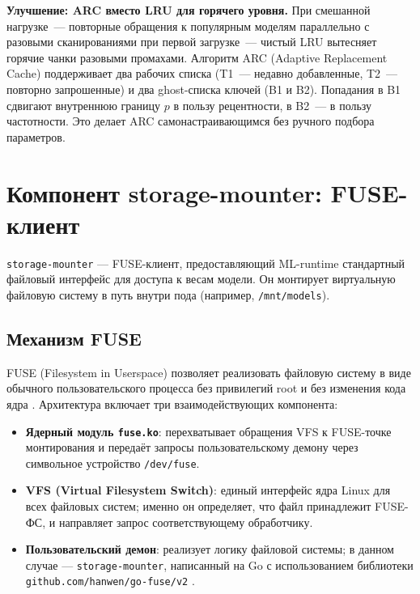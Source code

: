 \textbf{Улучшение: ARC вместо LRU для горячего уровня.} При смешанной нагрузке~--- повторные обращения к популярным моделям параллельно с разовыми сканированиями при первой загрузке~--- чистый LRU вытесняет горячие чанки разовыми промахами. Алгоритм ARC (Adaptive Replacement Cache) поддерживает два рабочих списка (T1~--- недавно добавленные, T2~--- повторно запрошенные) и два ghost-списка ключей (B1 и B2). Попадания в B1 сдвигают внутреннюю границу $p$ в пользу рецентности, в B2~--- в пользу частотности. Это делает ARC самонастраивающимся без ручного подбора параметров.

\section{Компонент storage-mounter: FUSE-клиент}

\texttt{storage-mounter} --- FUSE-клиент, предоставляющий ML-runtime стандартный файловый интерфейс для доступа к весам модели. Он монтирует виртуальную файловую систему в путь внутри пода (например, \texttt{/mnt/models}).

\subsection*{Механизм FUSE}

FUSE (Filesystem in Userspace) позволяет реализовать файловую систему в виде обычного пользовательского процесса без привилегий root и без изменения кода ядра \cite{fuse_kernel_docs}. Архитектура включает три взаимодействующих компонента:

\begin{itemize}[leftmargin=*]
  \item \textbf{Ядерный модуль \texttt{fuse.ko}}: перехватывает обращения VFS к FUSE-точке монтирования и передаёт запросы пользовательскому демону через символьное устройство \texttt{/dev/fuse}.
  \item \textbf{VFS (Virtual Filesystem Switch)}: единый интерфейс ядра Linux для всех файловых систем; именно он определяет, что файл принадлежит FUSE-ФС, и направляет запрос соответствующему обработчику.
  \item \textbf{Пользовательский демон}: реализует логику файловой системы; в данном случае --- \texttt{storage-mounter}, написанный на Go с использованием библиотеки \texttt{github.com/hanwen/go-fuse/v2} \cite{gofuse}.
\end{itemize}

